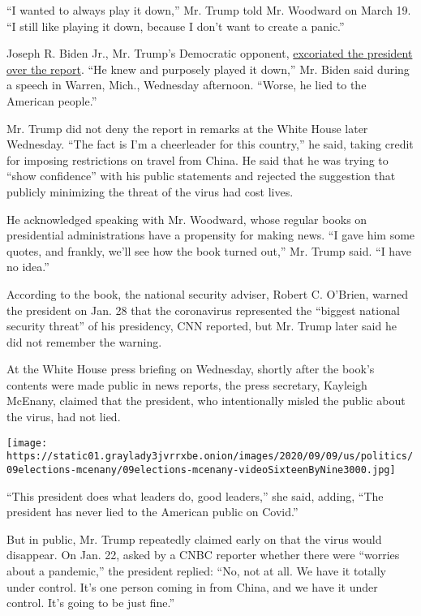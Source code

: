 ``I wanted to always play it down,'' Mr. Trump told Mr. Woodward on
March 19. ``I still like playing it down, because I don't want to create
a panic.''

Joseph R. Biden Jr., Mr. Trump's Democratic opponent,
\href{https://www.nytimes3xbfgragh.onion/2020/09/09/us/politics/biden-trump-michigan-jobs-taxes.html}{excoriated
the president over the report}. ``He knew and purposely played it
down,'' Mr. Biden said during a speech in Warren, Mich., Wednesday
afternoon. ``Worse, he lied to the American people.''

Mr. Trump did not deny the report in remarks at the White House later
Wednesday. ``The fact is I'm a cheerleader for this country,'' he said,
taking credit for imposing restrictions on travel from China. He said
that he was trying to ``show confidence'' with his public statements and
rejected the suggestion that publicly minimizing the threat of the virus
had cost lives.

He acknowledged speaking with Mr. Woodward, whose regular books on
presidential administrations have a propensity for making news. ``I gave
him some quotes, and frankly, we'll see how the book turned out,'' Mr.
Trump said. ``I have no idea.''

According to the book, the national security adviser, Robert C. O'Brien,
warned the president on Jan. 28 that the coronavirus represented the
``biggest national security threat'' of his presidency, CNN reported,
but Mr. Trump later said he did not remember the warning.

At the White House press briefing on Wednesday, shortly after the book's
contents were made public in news reports, the press secretary, Kayleigh
McEnany, claimed that the president, who intentionally misled the public
about the virus, had not lied.

\texttt{[image: https://static01.graylady3jvrrxbe.onion/images/2020/09/09/us/politics/09elections-mcenany/09elections-mcenany-videoSixteenByNine3000.jpg]}

``This president does what leaders do, good leaders,'' she said, adding,
``The president has never lied to the American public on Covid.''

But in public, Mr. Trump repeatedly claimed early on that the virus
would disappear. On Jan. 22, asked by a CNBC reporter whether there were
``worries about a pandemic,'' the president replied: ``No, not at all.
We have it totally under control. It's one person coming in from China,
and we have it under control. It's going to be just fine.''

